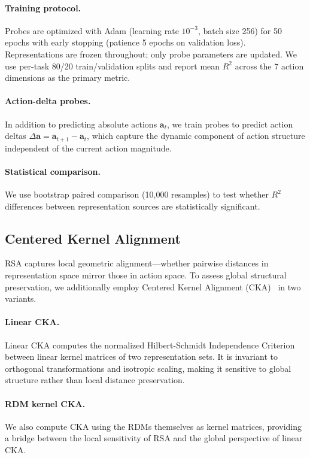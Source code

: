 \paragraph{Training protocol.}
Probes are optimized with Adam (learning rate $10^{-3}$, batch size 256) for 50 epochs with early stopping (patience 5 epochs on validation loss).
Representations are frozen throughout; only probe parameters are updated.
We use per-task 80/20 train/validation splits and report mean $R^2$ across the 7 action dimensions as the primary metric.

\paragraph{Action-delta probes.}
In addition to predicting absolute actions $\mathbf{a}_t$, we train probes to predict action deltas $\Delta\mathbf{a} = \mathbf{a}_{t+1} - \mathbf{a}_t$, which capture the dynamic component of action structure independent of the current action magnitude.

\paragraph{Statistical comparison.}
We use bootstrap paired comparison (10{,}000 resamples) to test whether $R^2$ differences between representation sources are statistically significant.

\subsection{Centered Kernel Alignment}
\label{sec:cka}

RSA captures local geometric alignment---whether pairwise distances in representation space mirror those in action space.
To assess global structural preservation, we additionally employ Centered Kernel Alignment (CKA)~\cite{kornblith2019} in two variants.

\paragraph{Linear CKA.}
Linear CKA computes the normalized Hilbert-Schmidt Independence Criterion between linear kernel matrices of two representation sets.
It is invariant to orthogonal transformations and isotropic scaling, making it sensitive to global structure rather than local distance preservation.

\paragraph{RDM kernel CKA.}
We also compute CKA using the RDMs themselves as kernel matrices, providing a bridge between the local sensitivity of RSA and the global perspective of linear CKA.

